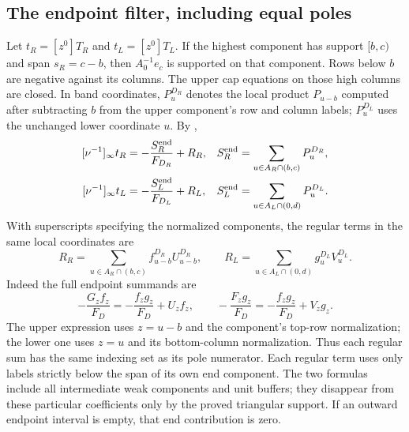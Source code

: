 \documentclass[11pt,a4paper]{amsart}
\numberwithin{equation}{section}
\theoremstyle{plain}
\theoremstyle{definition}
\begin{document}
\subsection{The endpoint filter, including equal poles}
Let \(t_R=[z^0]T_R\) and \(t_L=[z^0]T_L\).  If the highest component has support \([b,c)\) and span \(s_R=c-b\), then \(A_0^{-1}e_c\) is supported on that component.  Rows below \(b\) are negative against its columns.  The upper cap equations on those high columns are closed.
In band coordinates, \(P_u^{D_R}\) denotes the local product \(P_{u-b}\)
computed after subtracting \(b\) from the upper component's row and column
labels; \(P_u^{D_L}\) uses the unchanged lower coordinate \(u\).
By ,
\begin{equation}\label{eq:end-pole-expansion}
\begin{aligned}
 [\nu^{-1}]_\infty t_R&=-\frac{S_R^{\rm end}}{F_{D_R}}+R_R,
 &S_R^{\rm end}&=\sum_{u\in A_R\cap(b,c)}P_u^{D_R},\\
 [\nu^{-1}]_\infty t_L&=-\frac{S_L^{\rm end}}{F_{D_L}}+R_L,
 &S_L^{\rm end}&=\sum_{u\in A_L\cap(0,d)}P_u^{D_L}.
\end{aligned}
\end{equation}
With superscripts specifying the normalized components, the regular
terms in the same local coordinates are
\[
 R_R=\sum_{u\in A_R\cap(b,c)}
       f^{D_R}_{u-b}U^{D_R}_{u-b},\qquad
 R_L=\sum_{u\in A_L\cap(0,d)}
       g^{D_L}_uV^{D_L}_u.
\]
Indeed the full endpoint summands are
\[
 -\frac{G_zf_z}{F_D}
   =-\frac{f_zg_z}{F_D}+U_zf_z,\qquad
 -\frac{F_zg_z}{F_D}
   =-\frac{f_zg_z}{F_D}+V_zg_z.
\]
The upper expression uses \(z=u-b\) and the component's top-row
normalization; the lower one uses \(z=u\) and its bottom-column
normalization.  Thus each regular sum has the same indexing set as
its pole numerator.
Each regular term uses only labels strictly below the span of its own end component.  The two formulas include all intermediate weak components and unit buffers; they disappear from these particular coefficients only by the proved triangular support.  If an outward endpoint interval is empty, that end contribution is zero.
\end{document}
